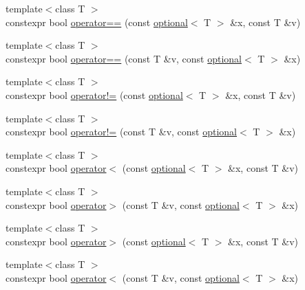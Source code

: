 \begin{DoxyCompactItemize}
\item 
{\footnotesize template$<$class T $>$ }\\constexpr bool \hyperlink{namespacestd_1_1experimental_ad40f3ff2c6562139fe910ab3d0a63f10}{operator==} (const \hyperlink{classstd_1_1experimental_1_1optional}{optional}$<$ T $>$ \&x, const T \&v)
\item 
{\footnotesize template$<$class T $>$ }\\constexpr bool \hyperlink{namespacestd_1_1experimental_a1958e649d145d612bc04a821d28c0ffb}{operator==} (const T \&v, const \hyperlink{classstd_1_1experimental_1_1optional}{optional}$<$ T $>$ \&x)
\item 
{\footnotesize template$<$class T $>$ }\\constexpr bool \hyperlink{namespacestd_1_1experimental_a65194017839ffdd2eeeb2f8f510d9a84}{operator!=} (const \hyperlink{classstd_1_1experimental_1_1optional}{optional}$<$ T $>$ \&x, const T \&v)
\item 
{\footnotesize template$<$class T $>$ }\\constexpr bool \hyperlink{namespacestd_1_1experimental_aa6a14a4a2f99c053eaf12e4d438786cc}{operator!=} (const T \&v, const \hyperlink{classstd_1_1experimental_1_1optional}{optional}$<$ T $>$ \&x)
\item 
{\footnotesize template$<$class T $>$ }\\constexpr bool \hyperlink{namespacestd_1_1experimental_acd496ce7fb815b5ed07c64c3c50473a5}{operator$<$} (const \hyperlink{classstd_1_1experimental_1_1optional}{optional}$<$ T $>$ \&x, const T \&v)
\item 
{\footnotesize template$<$class T $>$ }\\constexpr bool \hyperlink{namespacestd_1_1experimental_a2c15354bc231381036462b92afd3737e}{operator$>$} (const T \&v, const \hyperlink{classstd_1_1experimental_1_1optional}{optional}$<$ T $>$ \&x)
\item 
{\footnotesize template$<$class T $>$ }\\constexpr bool \hyperlink{namespacestd_1_1experimental_acd392a8263ad2dd322655078d53e77ad}{operator$>$} (const \hyperlink{classstd_1_1experimental_1_1optional}{optional}$<$ T $>$ \&x, const T \&v)
\item 
{\footnotesize template$<$class T $>$ }\\constexpr bool \hyperlink{namespacestd_1_1experimental_a1d3cd046025f9693e0c6c7e57c67e379}{operator$<$} (const T \&v, const \hyperlink{classstd_1_1experimental_1_1optional}{optional}$<$ T $>$ \&x)
\item 

\end{DoxyCompactItemize}

